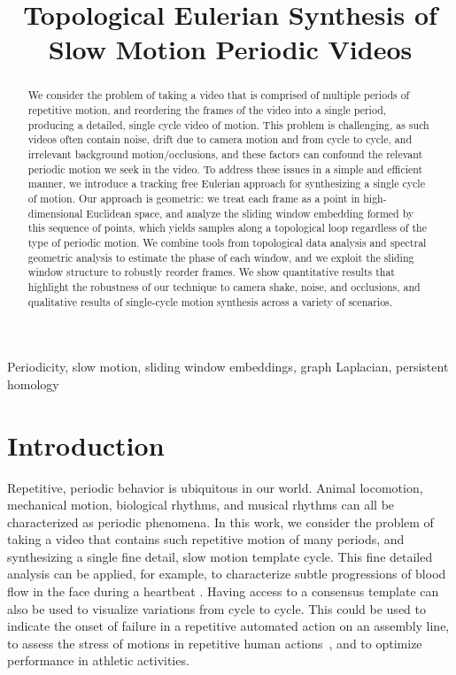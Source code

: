 \documentclass{article}
\title{Topological Eulerian Synthesis of Slow Motion Periodic Videos}
\begin{document}
%
\maketitle
%


\begin{abstract}

We consider the problem of taking a video that is comprised of multiple periods of repetitive motion, and reordering the frames of the video into a single period, producing a detailed, single cycle video of motion. This problem is challenging, as such videos often contain noise, drift due to camera motion and from cycle to cycle, and irrelevant background motion/occlusions, and these factors can confound the relevant periodic motion we seek in the video. To address these issues in a simple and efficient manner, we introduce a tracking free Eulerian approach for synthesizing a single cycle of motion. Our approach is geometric: we treat each frame as a point in high-dimensional Euclidean space, and analyze the sliding window embedding formed by this sequence of points, which yields samples along a topological loop regardless of the type of periodic motion.  We combine tools from topological data analysis and spectral geometric analysis to estimate the phase of each window, and we exploit the sliding window structure to robustly reorder frames.  We show quantitative results that highlight the robustness of our technique to camera shake, noise, and occlusions, and qualitative results of single-cycle motion synthesis across a variety of scenarios.

\end{abstract}
%
\begin{keywords}
Periodicity, slow motion, sliding window embeddings, graph Laplacian, persistent homology
\end{keywords}
%


\section{Introduction}

Repetitive, periodic behavior is ubiquitous in our world. Animal locomotion, mechanical motion, biological rhythms, and musical rhythms can all be characterized as periodic phenomena.  In this work, we consider the problem of taking a video that contains such repetitive motion of many periods, and synthesizing a single fine detail, slow motion template cycle.  This fine detailed analysis can be applied, for example, to characterize subtle progressions of blood flow in the face during a heartbeat \cite{kumar2015distanceppg}.  Having access to a consensus template can also be used to visualize variations from cycle to cycle. This could be used to indicate the onset of failure in a repetitive automated action on an assembly line, to assess the stress of motions in repetitive human actions~\cite{greene2017visualizing}, and to optimize performance in athletic activities.
\end{document}

